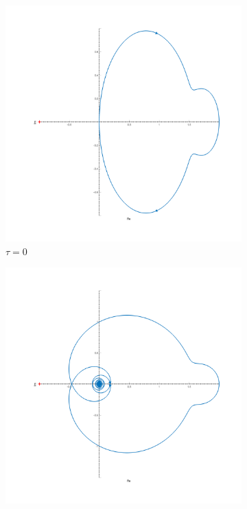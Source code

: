 \begin{figure}[ht!]
   \begin{subfigure}[b]{0.5\textwidth}
       \centering
       \includegraphics[width=\textwidth]{media/plots/task6_nyquist_open_1.png}
       \caption{$\tau = 0$}
   \end{subfigure}
    \begin{subfigure}[b]{0.5\textwidth}
         \centering
         \includegraphics[width=\textwidth]{media/plots/task6_nyquist_open_2.png}

\end{subfigure}
\end{figure}
